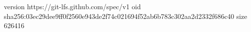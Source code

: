 version https://git-lfs.github.com/spec/v1
oid sha256:03ec29dee9ff0f2560e943de2f74c021694f52ab6b783c302aa2d2332f686c40
size 626416
